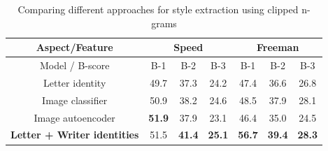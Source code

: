 \begin{table}[!htbp]
\centering
\begin{tabular}{|c||c|c|c||c|c|c|}
\hline
\multicolumn{1}{|c||}{Aspect/Feature} & \multicolumn{3}{c||}{ Speed } & \multicolumn{3}{c|}{ Freeman }   \\
\hline
Model / B-score      & B-1  & B-2  & B-3           & B-1  & B-2   & B-3              \\ \hline
Letter identity          & 49.7 & 37.3 & 24.2          & 47.4 & 36.6  & 26.8               \\\hline
Image classifier     & 50.9 & 38.2 & 24.6          & 48.5 & 37.9 & 28.1             \\\hline
Image autoencoder    & \textbf{51.9} & 37.9 & 23.1          & 46.4 & 35.0  & 24.5             \\\hline
\textbf{Letter + Writer identities} & 51.5 & \textbf{41.4} & \textbf{25.1}          & \textbf{56.7} & \textbf{39.4}  & \textbf{28.3}             \\\hline
\end{tabular}
\caption{Comparing different approaches for style extraction using clipped n-grams}
\label{table:1}
\end{table}

